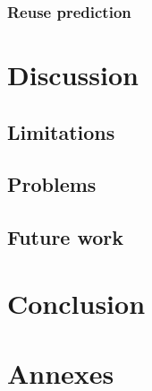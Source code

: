 \documentclass[a4paper]{article}
\begin{document}
	\subsubsection{Reuse prediction}
	
	
	\section{Discussion}
	
	\subsection{Limitations}
	
	
	\subsection{Problems}
	
	\subsection{Future work}

	\section{Conclusion}	
	
	
	
	
	
	
	
	
	
	\section{Annexes}
	
	
	
\end{document}
